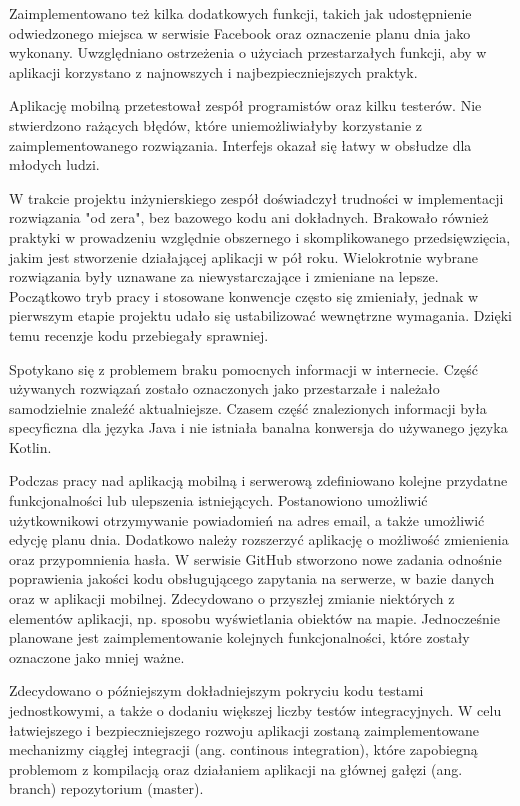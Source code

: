 \documentclass[10pt,twoside,a4paper]{report}
\begin{document}
\par Zaimplementowano też kilka dodatkowych funkcji, takich jak udostępnienie odwiedzonego miejsca w serwisie Facebook oraz oznaczenie planu dnia jako wykonany. Uwzględniano ostrzeżenia o użyciach przestarzałych funkcji, aby w aplikacji korzystano z najnowszych i najbezpieczniejszych praktyk.

\par Aplikację mobilną przetestował zespół programistów oraz kilku testerów. Nie stwierdzono rażących błędów, które uniemożliwiałyby korzystanie z zaimplementowanego rozwiązania. Interfejs okazał się łatwy w obsłudze dla młodych ludzi.

\par W trakcie projektu inżynierskiego zespół doświadczył trudności w implementacji rozwiązania "od zera", bez bazowego kodu ani dokładnych. Brakowało również praktyki w prowadzeniu względnie obszernego i skomplikowanego przedsięwzięcia, jakim jest stworzenie działającej aplikacji w pół roku. Wielokrotnie wybrane rozwiązania były uznawane za niewystarczające i zmieniane na lepsze. Początkowo tryb pracy i stosowane konwencje często się zmieniały, jednak w pierwszym etapie projektu udało się ustabilizować wewnętrzne wymagania. Dzięki temu recenzje kodu przebiegały sprawniej.

\par Spotykano się z problemem braku pomocnych informacji w internecie. Część używanych rozwiązań zostało oznaczonych jako przestarzałe i należało samodzielnie znaleźć aktualniejsze. Czasem część znalezionych informacji była specyficzna dla języka Java i nie istniała banalna konwersja do używanego języka Kotlin.

\par Podczas pracy nad aplikacją mobilną i serwerową zdefiniowano kolejne przydatne funkcjonalności lub ulepszenia istniejących. Postanowiono umożliwić użytkownikowi otrzymywanie powiadomień na adres email, a także umożliwić edycję planu dnia. Dodatkowo należy rozszerzyć aplikację o możliwość zmienienia oraz przypomnienia hasła. W serwisie GitHub stworzono nowe zadania odnośnie poprawienia jakości kodu obsługującego zapytania na serwerze, w bazie danych oraz w aplikacji mobilnej. Zdecydowano o przyszłej zmianie niektórych z elementów aplikacji, np. sposobu wyświetlania obiektów na mapie. Jednocześnie planowane jest zaimplementowanie kolejnych funkcjonalności, które zostały oznaczone jako mniej ważne.

\par Zdecydowano o późniejszym dokładniejszym pokryciu kodu testami jednostkowymi, a także o dodaniu większej liczby testów integracyjnych. W celu łatwiejszego i bezpieczniejszego rozwoju aplikacji zostaną zaimplementowane mechanizmy ciągłej integracji (ang. continous integration), które zapobiegną problemom z kompilacją oraz działaniem aplikacji na głównej gałęzi (ang. branch) repozytorium (master).
\end{document}
